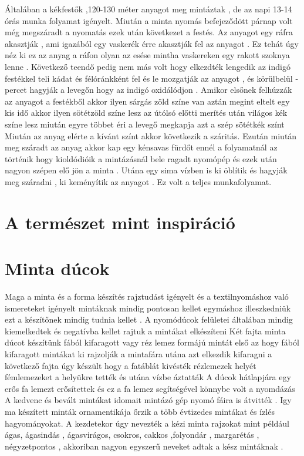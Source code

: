 \documentclass[fontsize=12pt, appendixprefix=true]{scrreprt}
\begin{document}
Általában a kékfestők  ,120-130 méter anyagot meg mintáztak , de az napi 13-14 órás munka folyamat igényelt. 
Miután a minta nyomás befejeződött  párnap volt még megszáradt a nyomatás ezek után következet a festés.
Az anyagot egy ráfra akasztják ,  ami  igazából egy vaskerék érre akasztják fel az anyagot .
Ez tehát  úgy néz ki  ez az anyag a ráfon  olyan az esése  mintha vaskereken egy rakott szoknya lenne .
Következő teendő pedig nem  más volt hogy elkezdték  lengedik  az indigó festékkel teli kádat és  félóránkként fel és le mozgatják az anyagot  , és körülbelül - percet hagyják a levegőn hogy az indigó oxidálódjon .
Amikor elsőnek felhúzzák az anyagot a festékből akkor ilyen sárgás zöld színe van aztán megint eltelt egy kis idő akkor ilyen sötétzöld színe lesz az útólsó előtti merítés után világos kék színe lesz 
miután egyre többet éri a levegő  megkapja azt a szép sötétkék színt 
Miután az anyag elérte a kívánt színt akkor következik a száritás. Ezután miután meg száradt az anyag akkor kap egy kénsavas fürdőt ennél a folyamatnál az történik hogy kioldódióik a mintázásnál bele ragadt  nyomópép és ezek után nagyon szépen elő jön a minta .
 Utána egy sima vízben is ki öblítik  és hagyják meg száradni , ki keményítik az anyagot .
Ez volt a teljes munkafolyamat.


\section{A természet mint inspiráció}


\section{Minta dúcok}
Maga a minta és a forma készítés rajztudást igényelt és a textilnyomáshoz való ismereteket igényelt 
mintáknak mindig pontosan kellet egymáshoz illeszkedniük  ezt a készítőnek mindig tudnia kellet .
A nyomódúcok felületei általában mindig kiemelkedtek és negatívba kellet rajtuk a mintákat elkészíteni 
Két fajta minta dúcot készítünk fából kifaragott vagy réz lemez formájú mintát 
első az hogy  fából kifaragott mintákat ki rajzolják a mintafára utána azt elkezdik kifaragni 
a következő fajta úgy készült hogy a fatáblát kivésték  rézlemezek helyét fémlemezeket a helyükre tették és utána vízbe áztatták 
A dúcok hátlapjára egy erős fa lemezt erősítettek és ez a fa lemez segítségével könnybe volt a nyomdázás
A kedvenc és bevált mintákat idomait mintázó gép nyomó fáira is átvitték .
Igy ma készített minták ornamentikája őrzik a több évtizedes mintákat és ízlés hagyományokat.
A kezdetekor úgy nevezték a kézi minta rajzokat mint például  ágas, ágasindás , ágasvirágos, csokros, cakkos ,folyondár , margarétás , négyzetpontos ,
akkoriban nagyon egyszerű neveket adtak a kész mintáknak .
\end{document}
